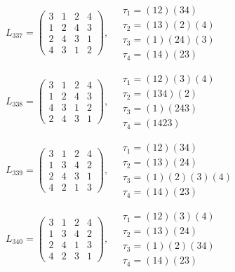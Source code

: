 $L_{337} = \begin{pmatrix} 3 & 1 & 2 & 4 \\ 1 & 2 & 4 & 3 \\ 2 & 4 & 3 & 1 \\ 4 & 3 & 1 & 2 \end{pmatrix}, \quad \begin{matrix} \tau_{1} = (1 2)(3 4) \\ \tau_{2} = (1 3)(2)(4) \\ \tau_{3} = (1)(2 4)(3) \\ \tau_{4} = (1 4)(2 3) \end{matrix}$

$L_{338} = \begin{pmatrix} 3 & 1 & 2 & 4 \\ 1 & 2 & 4 & 3 \\ 4 & 3 & 1 & 2 \\ 2 & 4 & 3 & 1 \end{pmatrix}, \quad \begin{matrix} \tau_{1} = (1 2)(3)(4) \\ \tau_{2} = (1 3 4)(2) \\ \tau_{3} = (1)(2 4 3) \\ \tau_{4} = (1 4 2 3) \end{matrix}$

$L_{339} = \begin{pmatrix} 3 & 1 & 2 & 4 \\ 1 & 3 & 4 & 2 \\ 2 & 4 & 3 & 1 \\ 4 & 2 & 1 & 3 \end{pmatrix}, \quad \begin{matrix} \tau_{1} = (1 2)(3 4) \\ \tau_{2} = (1 3)(2 4) \\ \tau_{3} = (1)(2)(3)(4) \\ \tau_{4} = (1 4)(2 3) \end{matrix}$

$L_{340} = \begin{pmatrix} 3 & 1 & 2 & 4 \\ 1 & 3 & 4 & 2 \\ 2 & 4 & 1 & 3 \\ 4 & 2 & 3 & 1 \end{pmatrix}, \quad \begin{matrix} \tau_{1} = (1 2)(3)(4) \\ \tau_{2} = (1 3)(2 4) \\ \tau_{3} = (1)(2)(3 4) \\ \tau_{4} = (1 4)(2 3) \end{matrix}$

